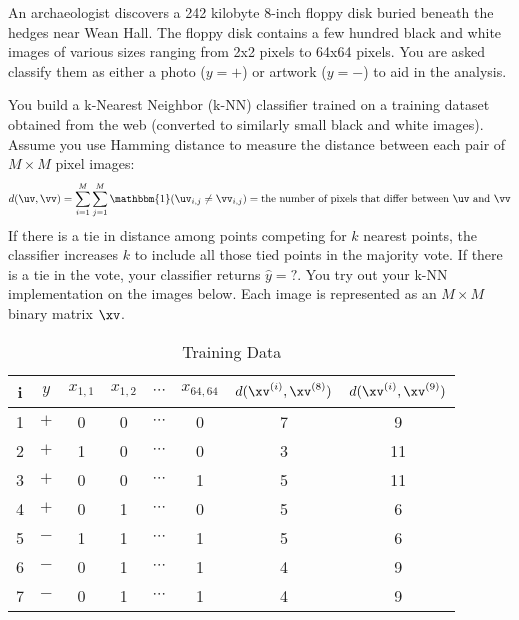 
\color{black}

\begin{EnvFullwidth}
An archaeologist discovers a 242 kilobyte 8-inch floppy disk buried beneath the hedges near Wean Hall. The floppy disk contains a few hundred black and white images of various sizes ranging from 2x2 pixels to 64x64 pixels. You are asked classify them as either a photo ($y=+$) or artwork ($y=-$) to aid in the analysis. 

You build a k-Nearest Neighbor (k-NN) classifier trained on a training dataset obtained from the web (converted to similarly small black and white images). Assume you use Hamming distance to measure the distance between each pair of $M \times M$ pixel images: 
$$d(\uv, \vv) = \sum_{i=1}^M \sum_{j=1}^M \mathbbm{1}(\uv_{i,j} \neq \vv_{i,j}) = \text{the number of pixels that differ between } \uv \text{ and } \vv$$
If there is a tie in distance among points competing for $k$ nearest points, the classifier increases $k$ to include all those tied points in the majority vote. If there is a tie in the vote, your classifier returns $\hat{y}=?$. 
You try out your k-NN implementation on the images below. Each image is represented as an $M \times M$ binary matrix $\xv$.

\begin{table}[H]
    \begin{center}
    \begin{tabular}{cccccc|c|c}
        \toprule
         i & $y$ & $x_{1,1}$ & $x_{1,2}$ & $\cdots$ & $x_{64,64}$ & $d(\xv^{(i)}, \xv^{(8)})$ & $d(\xv^{(i)}, \xv^{(9)})$  \\
         \midrule
         1 & $+$ & 0 & 0 & $\cdots$ & 0 & 7 & 9 \\
         2 & $+$ & 1 & 0 & $\cdots$ & 0 & 3 & 11 \\
         3 & $+$ & 0 & 0 & $\cdots$ & 1 & 5 & 11 \\
         4 & $+$ & 0 & 1 & $\cdots$ & 0 & 5 & 6 \\
         5 & $-$ & 1 & 1 & $\cdots$ & 1 & 5 & 6 \\
         6 & $-$ & 0 & 1 & $\cdots$ & 1 & 4 & 9 \\
         7 & $-$ & 0 & 1 & $\cdots$ & 1 & 4 & 9 \\
         \bottomrule
    \end{tabular}
    \end{center}
 \caption{Training Data}
 \label{tab:knnimages}
\end{table}


\end{EnvFullwidth}
